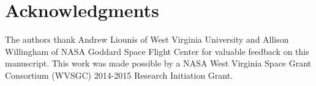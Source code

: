 \documentclass[]{aiaa-tc}%
\begin{document}
\section{Acknowledgments}
The authors thank Andrew Liounis of West Virginia University and Allison Willingham of NASA Goddard Space Flight Center for valuable feedback on this manuscript. This work was made possible by a NASA West Virginia Space Grant Consortium (WVSGC) 2014-2015 Research Initiation Grant. 



\end{document}
